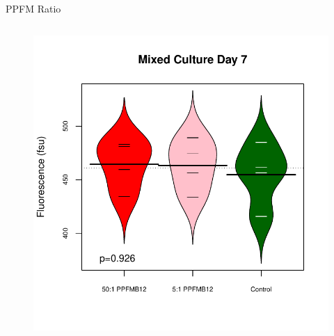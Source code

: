 \documentclass[8pt]{beamer}\usepackage[]{graphicx}\usepackage[]{color}
\begin{document}
\begin{frame}{PPFM Ratio}
\begin{columns}[t]
\begin{figure}
                                \includegraphics[width=1\textwidth]{./figure/ExpO_beanplot7_unlabeled}
                                \end{figure}
        \end{columns}
\end{frame}
\end{document}
